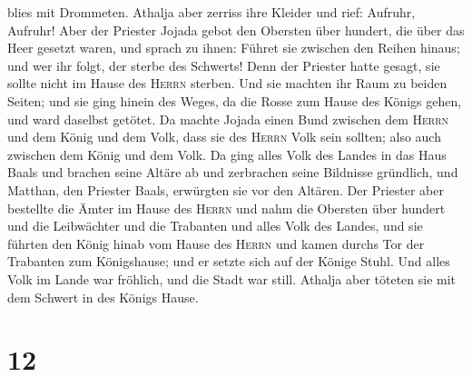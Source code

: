 blies mit Drommeten. Athalja aber zerriss ihre Kleider und rief:
Aufruhr, Aufruhr!  Aber der Priester Jojada gebot den
Obersten über hundert, die über das Heer gesetzt waren, und sprach zu
ihnen: Führet sie zwischen den Reihen hinaus; und wer ihr folgt, der
sterbe des Schwerts! Denn der Priester hatte gesagt, sie sollte nicht im
Hause des \textsc{Herrn} sterben.  Und sie machten ihr
Raum zu beiden Seiten; und sie ging hinein des Weges, da die Rosse zum
Hause des Königs gehen, und ward daselbst getötet.  Da
machte Jojada einen Bund zwischen dem \textsc{Herrn} und dem König und
dem Volk, dass sie des \textsc{Herrn} Volk sein sollten; also auch
zwischen dem König und dem Volk.  Da ging alles Volk des
Landes in das Haus Baals und brachen seine Altäre ab und zerbrachen
seine Bildnisse gründlich, und Matthan, den Priester Baals, erwürgten
sie vor den Altären. Der Priester aber bestellte die Ämter im Hause des
\textsc{Herrn}  und nahm die Obersten über hundert und
die Leibwächter und die Trabanten und alles Volk des Landes, und sie
führten den König hinab vom Hause des \textsc{Herrn} und kamen durchs
Tor der Trabanten zum Königshause; und er setzte sich auf der Könige
Stuhl.  Und alles Volk im Lande war fröhlich, und die
Stadt war still. Athalja aber töteten sie mit dem Schwert in des Königs
Hause.

\hypertarget{section-11}{%
\section{12}\label{section-11}}

